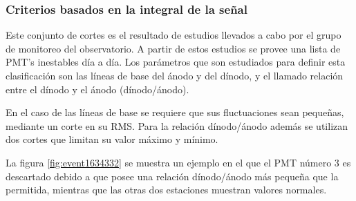 		\subsubsection{Criterios basados en la integral de la señal}
		
		Este conjunto de cortes es el resultado de estudios \cite{pmtsAuger} llevados a cabo por el grupo de monitoreo del observatorio. 
		A partir de estos estudios se provee una lista de PMT's inestables día a día.
		Los parámetros que son estudiados para definir esta clasificación son las líneas de base del ánodo y del dínodo, y el llamado relación entre el dínodo y el ánodo (dínodo/ánodo).
		
		En el caso de las líneas de base se requiere que sus fluctuaciones sean pequeñas, mediante un corte en su RMS. Para la relación dínodo/ánodo además se utilizan dos cortes que limitan su valor máximo y mínimo.
		
		La figura \ref{fig:event1634332} se muestra un ejemplo en el que el PMT número 3 es descartado debido a que posee una relación dínodo/ánodo más pequeña que la permitida, mientras que las otras dos estaciones muestran valores normales.
		
